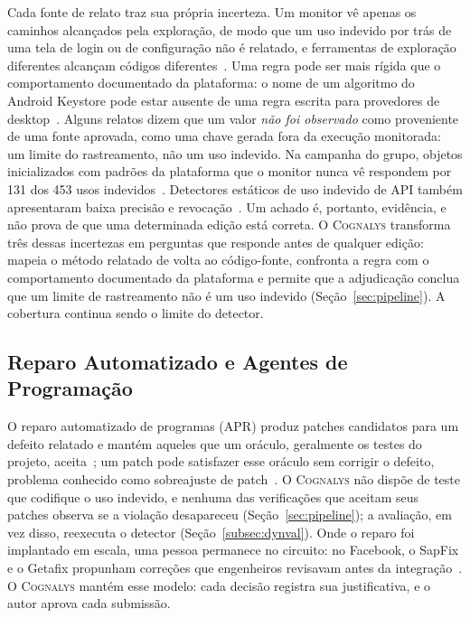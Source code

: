 \documentclass[conference]{IEEEtran}
\newcommand{\system}{\textsc{Cognalys}}
\begin{document}
Cada fonte de relato traz sua própria incerteza. Um monitor vê apenas os
caminhos alcançados pela exploração, de modo que um uso indevido por trás de uma
tela de login ou de configuração não é relatado, e ferramentas de exploração
diferentes alcançam códigos diferentes~\cite{costa2026effectiveness}. Uma regra pode ser mais rígida que o
comportamento documentado da plataforma: o nome de um algoritmo do Android
Keystore pode estar ausente de uma regra escrita para provedores de desktop~\cite{costa2026effectiveness}.
Alguns relatos dizem que um valor \emph{não foi observado} como proveniente de uma fonte
aprovada, como uma chave gerada fora da execução monitorada: um limite do
rastreamento, não um uso indevido. Na campanha do grupo, objetos inicializados com
padrões da plataforma que o monitor nunca vê respondem por 131 dos 453 usos
indevidos~\cite{costa2026effectiveness}. Detectores estáticos de uso indevido de API também apresentaram
baixa precisão e revocação~\cite{amann2019evaluation}. Um achado é, portanto, evidência, e não
prova de que uma determinada edição está correta.
O \system{} transforma três dessas incertezas em perguntas que responde antes
de qualquer edição: mapeia o método relatado de volta ao código-fonte, confronta
a regra com o comportamento documentado da plataforma e permite que a
adjudicação conclua que um limite de rastreamento não é um uso indevido
(Seção~\ref{sec:pipeline}). A cobertura continua sendo
o limite do detector.

\subsection{Reparo Automatizado e Agentes de Programação}
\label{subsec:apr}

O reparo automatizado de programas (APR) produz patches candidatos para um
defeito relatado e mantém aqueles que um oráculo, geralmente os testes do
projeto, aceita~\cite{legoues2019apr}; um patch pode satisfazer esse oráculo sem
corrigir o defeito, problema conhecido como sobreajuste de
patch~\cite{smith2015overfitting}. O \system{} não dispõe de teste que codifique
o uso indevido, e nenhuma das verificações que aceitam seus patches observa se a
violação desapareceu (Seção~\ref{sec:pipeline}); a avaliação, em vez disso,
reexecuta o detector (Seção~\ref{subsec:dynval}). Onde o reparo foi implantado em escala, uma pessoa
permanece no circuito: no Facebook, o SapFix e o Getafix propunham correções que
engenheiros revisavam antes da integração~\cite{marginean2019sapfix,bader2019getafix}.
O \system{} mantém esse modelo: cada decisão registra sua justificativa, e o
autor aprova cada submissão.
\end{document}
